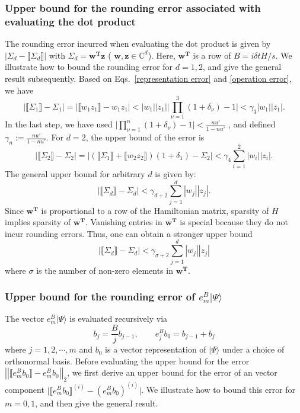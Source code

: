 \documentclass[letterpaper,10pt]{iopart}
\newcommand{\dket}[1]{|#1\rangle}
\newcommand{\norm}[1]{\left|\left|#1\right|\right|}
\begin{document}
\subsubsection{Upper bound for the rounding error associated with evaluating the dot product}
The rounding error incurred when evaluating the dot product is given by $|\Sigma_d-\llbracket \Sigma_d\rrbracket|$ with $\Sigma_d=\boldsymbol{w^\text{T}z}$ ( $\boldsymbol{w},\boldsymbol {z} \in\mathbb{C}^{d}$). Here, $\boldsymbol{w^\text{T}}$ is a row of $B=i\delta t H/s$. We illustrate how to bound the rounding error for $d=1,2$, and give the general result subsequently. Based on Eqs.\ \eqref{representation error} and \eqref{operation error}, we have
\begin{equation}
\label{c7}
    |\llbracket \Sigma_1\rrbracket-\Sigma_1|=|\llbracket w_1  z_1\rrbracket-w_1z_1|<|w_1||z_1|\big|\prod_{\nu=1}^3(1+\delta_\nu)-1\big|<\gamma_3 |w_1||z_1|.
\end{equation}
In the last step, we have used $\big|\prod_{\nu=1}^n(1+\delta_\nu)-1\big|<\frac{nu'}{1-nu'}$ \cite{higham2002accuracy}, and defined $\gamma_n:=\frac{nu'}{1-nu'}$. For $d=2$, the upper bound of the error is
\begin{equation}
\label{c8}
     |\llbracket \Sigma_2\rrbracket-\Sigma_2|=|(\llbracket \Sigma_1\rrbracket+\llbracket w_2 z_2\rrbracket )(1+\delta_1)-\Sigma_2|<\gamma_4\sum_{i=1}^2|w_i||z_i|.
\end{equation}
The general upper bound for arbitrary $d$ is given by:
\begin{equation}
    |\llbracket \Sigma_d\rrbracket-\Sigma_d| <\gamma_{d+2}\sum_{j=1}^{d}|w_j|| z_j|.
\end{equation}
Since $\boldsymbol{w^\text{T}}$ is proportional to a row of the Hamiltonian matrix, sparsity of $H$ implies sparsity of $\boldsymbol{w^\text{T}}$. Vanishing entries in $\boldsymbol{w^\text{T}}$ is special because they do not incur rounding errors. Thus, one can obtain a stronger upper bound
\begin{equation}
\label{C10}
    |\llbracket \Sigma_d\rrbracket-\Sigma_d|<\gamma_{\sigma+2}\sum_{j=1}^{d}|w_j|| z_j|
\end{equation}
where $\sigma$ is the number of non-zero elements in $\boldsymbol{w^\text{T}}$.
\subsubsection{Upper bound for the rounding error of  $e^B_m\dket{\Psi}$}
The vector $e^B_m\dket{\Psi}$ is evaluated recursively via
\begin{equation}
\label{recursive relation 1}
    b_j= \frac{B}{j}b_{j-1},\qquad e^B_j b_0=b_{j-1}+b_j
\end{equation}
where $j=1,2,\cdots,m$ and $b_0$ is a vector representation of $\dket{\Psi}$ under a choice of orthonormal basis. Before evaluating the upper bound for the error $\norm{\llbracket e^B_mb_0\rrbracket-e^B_mb_0}_2$, we first derive an upper bound for the error of an vector component $\big|\llbracket e^B_mb_0 \rrbracket^{(i)}-(e^B_mb_0) ^{(i)}\big|$. We illustrate how to bound this error for $m=0,1$, and then give the general result.
\end{document}
